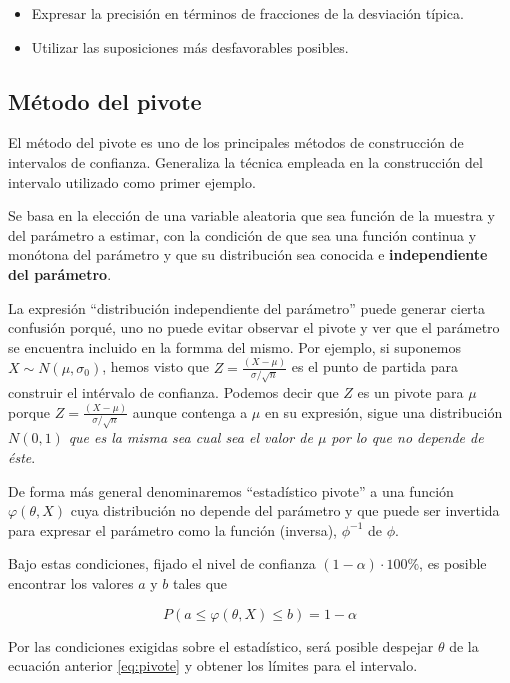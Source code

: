 \documentclass[
]{article}
\providecommand{\tightlist}{%
  \setlength{\itemsep}{0pt}\setlength{\parskip}{0pt}}
\begin{document}
\begin{itemize}
\tightlist
\item
  Expresar la precisión en términos de fracciones de la desviación típica.
\item
  Utilizar las suposiciones más desfavorables posibles.
\end{itemize}

\subsection{Método del pivote}\label{muxe9todo-del-pivote}

El método del pivote es uno de los principales métodos de construcción de intervalos de confianza. Generaliza la técnica empleada en la construcción del intervalo utilizado como primer ejemplo.

Se basa en la elección de una variable aleatoria que sea función de la muestra y del parámetro a estimar, con la condición de que sea una función continua y monótona del parámetro y que su distribución sea conocida e \textbf{independiente del parámetro}.

La expresión ``distribución independiente del parámetro'' puede generar cierta confusión porqué, uno no puede evitar observar el pivote y ver que el parámetro se encuentra incluido en la formma del mismo. Por ejemplo, si suponemos \(X\sim N(\mu, \sigma_0)\), hemos visto que \(Z=\frac{(X-\mu)}{\sigma/\sqrt{n}}\) es el punto de partida para construir el intérvalo de confianza. Podemos decir que \(Z\) es un pivote para \(\mu\) porque \(Z=\frac{(X-\mu)}{\sigma/\sqrt{n}}\) aunque contenga a \(\mu\) en su expresión, sigue una distribución \(N(0,1)\) \emph{que es la misma sea cual sea el valor de \(\mu\) por lo que no depende de éste}.

De forma más general denominaremos ``estadístico pivote'' a una función \(\varphi(\theta, X)\) cuya distribución no depende del parámetro y que puede ser invertida para expresar el parámetro como la función (inversa), \(\phi^{-1}\) de \(\phi\).

Bajo estas condiciones, fijado el nivel de confianza \((1-\alpha) \cdot 100 \%\), es posible encontrar los valores \(a\) y \(b\) tales que

\begin{equation}
P(a \leq \varphi(\theta, X) \leq b)=1-\alpha
\label{eq:pivote}
\end{equation}

Por las condiciones exigidas sobre el estadístico, será posible despejar \(\theta\) de la ecuación anterior \eqref{eq:pivote} y obtener los límites para el intervalo.
\end{document}
